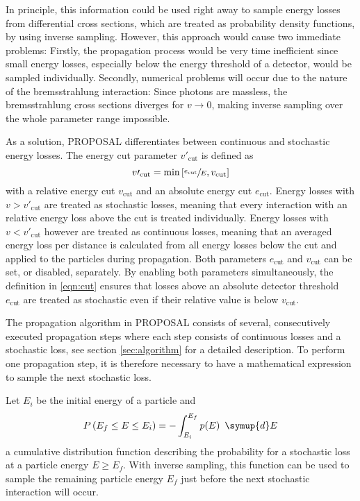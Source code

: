 In principle, this information could be used right away to sample energy losses from differential cross sections, which are treated as probability density functions, by using inverse sampling.
However, this approach would cause two immediate problems:
Firstly, the propagation process would be very time inefficient since small energy losses, especially below the energy threshold of a detector, would be sampled individually.
Secondly, numerical problems will occur due to the nature of the bremsstrahlung interaction:
Since photons are massless, the bremsstrahlung cross sections diverges for $v \to 0$, making inverse sampling over the whole parameter range impossible.

As a solution, PROPOSAL differentiates between continuous and stochastic energy losses.
The energy cut parameter $v\prime_\text{cut}$ is defined as
%
\begin{equation}
	\label{eqn:cut}
	v\prime_\text{cut} = \text{min}\left[\sfrac{e_\text{cut}}{E}, v_\text{cut} \right]
\end{equation}
%
with a relative energy cut $v_\text{cut}$ and an absolute energy cut $e_\text{cut}$.
Energy losses with $v > v\prime_\text{cut}$ are treated as stochastic losses, meaning that every interaction with an relative energy loss above the cut is treated individually.
Energy losses with $v < v\prime_\text{cut}$ however are treated as continuous losses, meaning that an averaged energy loss per distance is calculated from all energy losses below the cut and applied to the particles during propagation.
Both parameters $e_{\text{cut}}$ and $v_{\text{cut}}$ can be set, or disabled, separately.
By enabling both parameters simultaneously, the definition in \eqref{eqn:cut} ensures that losses above an absolute detector threshold $e_\text{cut}$ are treated as stochastic even if their relative value is below $v_{\text{cut}}$.

The propagation algorithm in PROPOSAL consists of several, consecutively executed propagation steps where each step consists of continuous losses and a stochastic loss, see section \ref{sec:algorithm} for a detailed description.
To perform one propagation step, it is therefore necessary to have a mathematical expression to sample the next stochastic loss.

Let $E_i$ be the initial energy of a particle and
%
\begin{equation}
	\label{eqn:cum}
	P\left(E_f \leq E \leq E_i\right) = - \int_{E_i}^{E_f} p(E) \, \symup{d}E
\end{equation}
%
a cumulative distribution function describing the probability for a stochastic loss at a particle energy $E \geq E_f$.
With inverse sampling, this function can be used to sample the remaining particle energy $E_f$ just before the next stochastic interaction will occur.

